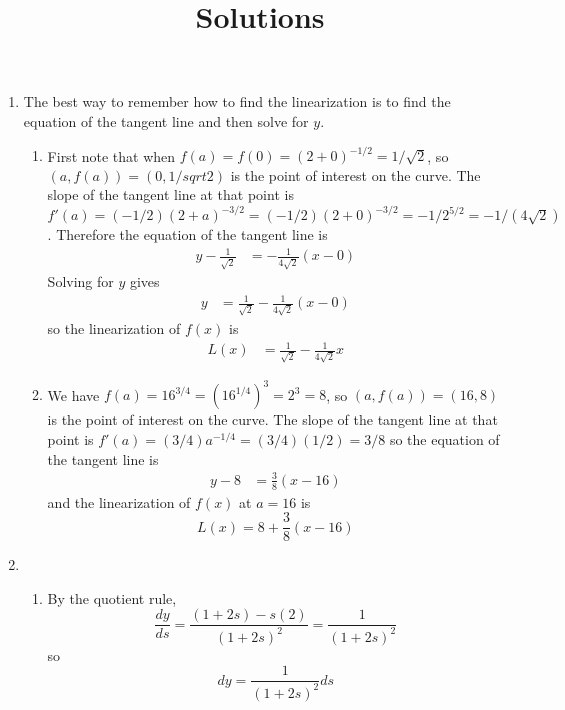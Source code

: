 \documentclass{article}
\title{\commonPSTitleZeroTwoNine\ Solutions}
\author{\commonAuthor}
\date{\commonDateZeroTwoNine}
\begin{document}
\maketitle
\begin{enumerate}
\item %
  The best way to remember how to find the linearization is to find
  the equation of the tangent line and then solve for $y$.
  \begin{enumerate}
  \item First note that when $f(a)=f(0)=(2+0)^{-1/2}=1/\sqrt{2}$, so
    $(a,f(a))=(0,1/sqrt{2})$ is the point of interest on the curve.  The slope
    of the tangent line at that point is $f'(a)=(-1/2)(2+a)^{-3/2}=
    (-1/2)(2+0)^{-3/2}=-1/2^{5/2}=-1/(4\sqrt{2})$.  Therefore the equation
    of the tangent line is
    \begin{align*}
      y-\frac{1}{\sqrt{2}} &= -\frac{1}{4\sqrt{2}} (x-0)
    \end{align*}
    Solving for $y$ gives
    \begin{align*}
      y &= \frac{1}{\sqrt{2}} -\frac{1}{4\sqrt{2}} (x-0)
    \end{align*}
    so the linearization of $f(x)$ is
    \begin{align*}
      L(x) &= \frac{1}{\sqrt{2}} -\frac{1}{4\sqrt{2}} x
    \end{align*}
  \item We have $f(a)=16^{3/4}=(16^{1/4})^3=2^3=8$, so $(a,f(a))=(16,8)$
    is the point of interest on the curve.  The slope of the tangent line
    at that point is $f'(a)=(3/4)a^{-1/4} = (3/4) (1/2) = 3/8$ so the
    equation of the tangent line is
    \begin{align*}
      y-8 &= \frac{3}{8} (x-16)
    \end{align*}
    and the linearization of $f(x)$ at $a=16$ is
    \begin{equation*}
      L(x) = 8 + \frac{3}{8} (x-16)
    \end{equation*}
  \end{enumerate}
\item %
  \begin{enumerate}
  \item By the quotient rule,
    \begin{equation*}
      \frac{dy}{ds} = \frac{(1+2s)-s(2)}{(1+2s)^2}
      = \frac{1}{(1+2s)^2}
    \end{equation*}
    so
    \begin{equation*}
      dy = \frac{1}{(1+2s)^2} ds
    \end{equation*}

\end{enumerate}
\end{enumerate}
\end{document}
